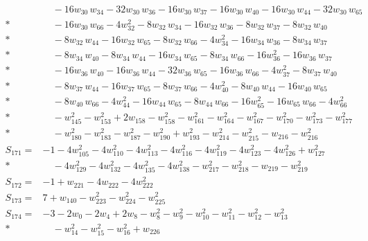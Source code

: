 \documentclass[11pt]{article}
\theoremstyle{remark}\newtheorem{remark}[theorem]{Remark}
\begin{document}
\begin{align*}
&\quad  - 16w_{30}\,w_{34} - 32w_{30}\,w_{36} - 16w_{30}\,w_{37} - 16w_{30}\,w_{40} - 16w_{30}\,w_{44} - 32w_{30}\,w_{65} \\*
&\quad  - 16w_{30}\,w_{66} - 4w_{32}^{2} - 8w_{32}\,w_{34} - 16w_{32}\,w_{36} - 8w_{32}\,w_{37} - 8w_{32}\,w_{40} \\*
&\quad  - 8w_{32}\,w_{44} - 16w_{32}\,w_{65} - 8w_{32}\,w_{66} - 4w_{34}^{2} - 16w_{34}\,w_{36} - 8w_{34}\,w_{37} \\*
&\quad  - 8w_{34}\,w_{40} - 8w_{34}\,w_{44} - 16w_{34}\,w_{65} - 8w_{34}\,w_{66} - 16w_{36}^{2} - 16w_{36}\,w_{37} \\*
&\quad  - 16w_{36}\,w_{40} - 16w_{36}\,w_{44} - 32w_{36}\,w_{65} - 16w_{36}\,w_{66} - 4w_{37}^{2} - 8w_{37}\,w_{40} \\*
&\quad  - 8w_{37}\,w_{44} - 16w_{37}\,w_{65} - 8w_{37}\,w_{66} - 4w_{40}^{2} - 8w_{40}\,w_{44} - 16w_{40}\,w_{65} \\*
&\quad  - 8w_{40}\,w_{66} - 4w_{44}^{2} - 16w_{44}\,w_{65} - 8w_{44}\,w_{66} - 16w_{65}^{2} - 16w_{65}\,w_{66} - 4w_{66}^{2} \\*
&\quad  - w_{145}^{2} - w_{153}^{2} + 2w_{158} - w_{158}^{2} - w_{161}^{2} - w_{164}^{2} - w_{167}^{2} - w_{170}^{2} - w_{173}^{2} - w_{177}^{2} \\*
&\quad  - w_{180}^{2} - w_{183}^{2} - w_{187}^{2} - w_{190}^{2} + w_{193}^{2} - w_{214}^{2} - w_{215}^{2} - w_{216} - w_{216}^{2} \\[2pt]
S_{171}={}& -1 - 4w_{105}^{2} - 4w_{110}^{2} - 4w_{113}^{2} - 4w_{116}^{2} - 4w_{119}^{2} - 4w_{123}^{2} - 4w_{126}^{2} + w_{127}^{2} \\*
&\quad  - 4w_{129}^{2} - 4w_{132}^{2} - 4w_{135}^{2} - 4w_{138}^{2} - w_{217}^{2} - w_{218}^{2} - w_{219} - w_{219}^{2} \\[2pt]
S_{172}={}& -1 + w_{221} - 4w_{222} - 4w_{222}^{2} \\[2pt]
S_{173}={}& 7 + w_{140} - w_{223}^{2} - w_{224}^{2} - w_{225}^{2} \\[2pt]
S_{174}={}& -3 - 2w_{0} - 2w_{4} + 2w_{8} - w_{8}^{2} - w_{9}^{2} - w_{10}^{2} - w_{11}^{2} - w_{12}^{2} - w_{13}^{2} \\*
&\quad  - w_{14}^{2} - w_{15}^{2} - w_{16}^{2} + w_{226} \\
\end{align*}
\endgroup
\end{document}
